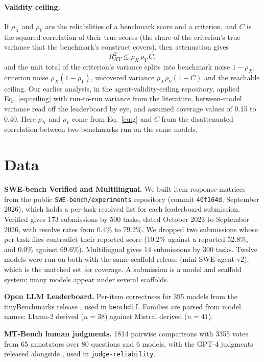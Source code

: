 \documentclass[11pt]{article}
\begin{document}
\paragraph{Validity ceiling.} If $\rho_X$ and $\rho_Y$ are the reliabilities of a benchmark score and a criterion, and $C$ is the squared correlation of their true scores (the share of the criterion's true variance that the benchmark's construct covers), then attenuation gives
\begin{equation}
R^2_{XY} \le \rho_X\, \rho_Y\, C,
\label{eq:ceiling}
\end{equation}
and the unit total of the criterion's variance splits into benchmark noise $1-\rho_X$, criterion noise $\rho_X(1-\rho_Y)$, uncovered variance $\rho_X\rho_Y(1-C)$ and the reachable ceiling. Our earlier analysis, in the agent-validity-ceiling repository, applied Eq.~\ref{eq:ceiling} with run-to-run variance from the literature, between-model variance read off the leaderboard by eye, and assumed coverage values of 0.15 to 0.40. Here $\rho_X$ and $\rho_Y$ come from Eq.~\ref{eq:g} and $C$ from the disattenuated correlation between two benchmarks run on the same models.

\section{Data}

\textbf{SWE-bench Verified and Multilingual.} We built item response matrices from the public \texttt{SWE-bench/experiments} repository (commit \texttt{40f164d}, September 2026), which holds a per-task resolved list for each leaderboard submission. Verified gives 173 submissions by 500 tasks, dated October 2023 to September 2026, with resolve rates from 0.4\% to 79.2\%. We dropped two submissions whose per-task files contradict their reported score (10.2\% against a reported 52.8\%, and 0.0\% against 69.6\%). Multilingual gives 14 submissions by 300 tasks. Twelve models were run on both with the same scaffold release (mini-SWE-agent v2), which is the matched set for coverage. A submission is a model and scaffold system; many models appear under several scaffolds.

\textbf{Open LLM Leaderboard.} Per-item correctness for 395 models from the tinyBenchmarks release \citep{polo2024tinybenchmarks}, used in \texttt{benchdif}. Families are parsed from model names: Llama-2 derived ($n=38$) against Mistral derived ($n=41$).

\textbf{MT-Bench human judgments.} 1814 pairwise comparisons with 3355 votes from 65 annotators over 80 questions and 6 models, with the GPT-4 judgments released alongside \citep{zheng2023judging}, used in \texttt{judge-reliability}.
\end{document}
